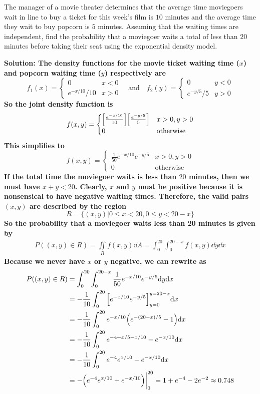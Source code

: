 \begin{example}
The manager of a movie theater determines that the average time moviegoers
wait in line to buy a ticket for this week's film is $10$ minutes and the average time they wait to buy popcorn is $5$ minutes. Assuming that the waiting times are independent, find the probability that a moviegoer waits a total of less than $20$ minutes before taking their seat using the exponential density model. \par
\bf{Solution: }The density functions for the movie ticket waiting time ($x$) and popcorn waiting time ($y$) respectively are
\[ f_1(x) = \begin{cases}
    0 & x < 0 \\
    e^{-x/10}/10 & x > 0
\end{cases}\quad\text{and}\quad f_2(y)=\begin{cases}
    0 & y < 0 \\
    e^{-y/5}/5 & y > 0
\end{cases} \]
So the joint density function is
\[ f(x,y) = \begin{cases}
    \bqty{\frac{e^{-x/10}}{10}}\bqty{\frac{e^{-y/5}}{5}} & x > 0, y > 0 \\
    0 & \text{otherwise}
\end{cases} \]
This simplifies to
\[ f(x,y) = \begin{cases}
    \frac{1}{50}e^{-x/10}e^{-y/5} & x > 0, y > 0 \\
    0 & \text{otherwise}
\end{cases} \]
If the total time the moviegoer waits is less than $20$ minutes, then we must have $x+y < 20$. Clearly, $x$ and $y$ must be positive because it is nonsensical to have negative waiting times. Therefore, the valid pairs $(x,y)$ are described by the region
\[ R = \{(x,y)|0\leq x < 20, 0\leq y< 20-x \} \]
So the probability that a moviegoer waits less than 20 minutes is given by
\begin{align*}
    P((x,y)\in R) = \iint\limits_R f(x,y)\dd A = \int_0^{20}\int_0^{20-x}f(x,y)\dd y\dd x
\end{align*}
Because we never have $x$ or $y$ negative, we can rewrite as
\begin{align*}
    P((x,y)\in R) &= \int_0^{20}\int_0^{20-x} \frac{1}{50}e^{-x/10}e^{-y/5}\dd y\dd x \\
    &= -\frac{1}{10}\int_0^{20}\bqty{e^{-x/10}e^{-y/5}}_{y=0}^{y=20-x}\dd x \\
    &= -\frac{1}{10}\int_0^{20}e^{-x/10}\pqty{e^{-(20-x)/5}-1}\dd x \\
    &= -\frac{1}{10}\int_0^{20}e^{-4 + x /5 - x/10}-e^{-x/10}\dd x \\
    &=-\frac{1}{10}\int_0^{20}e^{-4}e^{x/10}-e^{-x/10}\dd x \\
    &=-\pqty{e^{-4}e^{x/10}+e^{-x/10}}\biggr|_0^{20} = 1+e^{-4}-2e^{-2} \approx 0.748
\end{align*}
\end{example}
